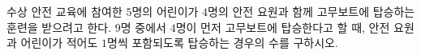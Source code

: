 \hspace*{2mm}\begin{minipage}[t]{\dimexpr\linewidth-2mm\relax}\vspace{0pt}
수상 안전 교육에 참여한 $5$명의 어린이가 $4$명의 안전 요원과 함께 고무보트에 탑승하는 훈련을 받으려고 한다. $9$명 중에서 $4$명이 먼저 고무보트에 탑승한다고 할 때, 안전 요원과 어린이가 적어도 $1$명씩 포함되도록 탑승하는 경우의 수를 구하시오.\end{minipage}
